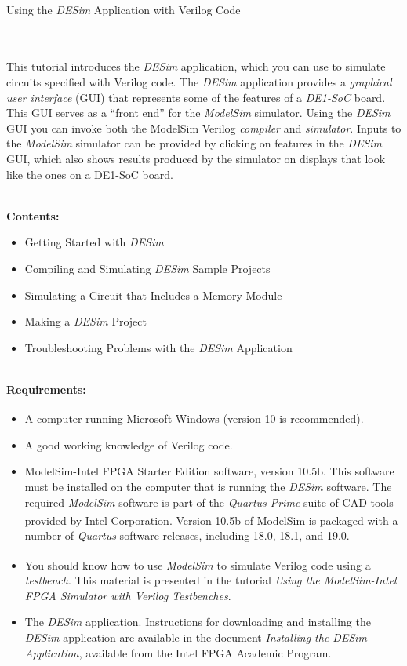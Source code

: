 \documentclass[epsfig,10pt,fullpage]{article} \addtolength{\textwidth}{1.5in}
\begin{document}
~\\
\centerline{\huge Using the {\it DESim} Application with Verilog Code}
~\\
~\\
This tutorial introduces the {\it DESim} application, which you can use to simulate 
circuits specified with Verilog code. The {\it DESim} application provides a 
{\it graphical user interface} (GUI) that represents some of the features of a {\it DE1-SoC}
board. This GUI serves as a ``front end'' for the {\it ModelSim} simulator. Using the 
{\it DESim} GUI you can invoke both the ModelSim Verilog {\it compiler} and {\it simulator}. 
Inputs to the {\it ModelSim} simulator can be provided by clicking on features in the
{\it DESim} GUI, which also shows results produced by the simulator on displays that look
like the ones on a DE1-SoC board.

~\\
\noindent
{\bf Contents:}
\begin{itemize}
\item Getting Started with {\it DESim}
\item Compiling and Simulating {\it DESim} Sample Projects
\item Simulating a Circuit that Includes a Memory Module
\item Making a {\it DESim} Project
\item Troubleshooting Problems with the {\it DESim} Application
\end{itemize}

~\\
\noindent
{\bf Requirements:}
\begin{itemize}
\item A computer running Microsoft\textsuperscript{\textregistered} Windows\textsuperscript{\textregistered} (version 10 is recommended).
\item A good working knowledge of Verilog code.
\item ModelSim-Intel FPGA Starter Edition software, version 10.5b. This software must be
installed on the computer that is running the {\it DESim} software. The required
{\it ModelSim} software is part of the {\it Quartus Prime} suite of CAD tools provided by Intel\textsuperscript{\textregistered} Corporation. 
Version 10.5b of ModelSim is packaged with a number of {\it Quartus} software releases, including 
18.0, 18.1, and 19.0.
\item You should know how to use {\it ModelSim}\textsuperscript{\textregistered} to simulate Verilog code using a {\it testbench}. This material is presented in the tutorial {\it Using the 
ModelSim-Intel FPGA Simulator with Verilog Testbenches}.
\item The {\it DESim} application. Instructions for downloading and installing the {\it DESim} 
application are available in the document {\it Installing the DESim Application}, available from
the Intel FPGA Academic Program.
\end{itemize}
\end{document}
